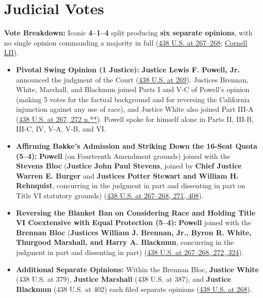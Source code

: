 \documentclass[12pt]{article}
\begin{document}
\section{Judicial Votes}
\textbf{Vote Breakdown:} Iconic \textbf{4--1--4} split producing \textbf{six separate opinions}, with no single opinion commanding a majority in full (\href{https://supreme.justia.com/cases/federal/us/438/265/}{438 U.S. at 267--268}; \href{https://www.law.cornell.edu/supremecourt/text/438/265}{Cornell LII}).
\begin{itemize}
\item \textbf{Pivotal Swing Opinion (1 Justice):} \textbf{Justice Lewis F. Powell, Jr.} announced the judgment of the Court (\href{https://supreme.justia.com/cases/federal/us/438/265/}{438 U.S. at 269}). Justices Brennan, White, Marshall, and Blackmun joined Parts I and V-C of Powell's opinion (making 5 votes for the factual background and for reversing the California injunction against any use of race), and Justice White also joined Part III-A (\href{https://supreme.justia.com/cases/federal/us/438/265/}{438 U.S. at 267, 272 n.**}). Powell spoke for himself alone in Parts II, III-B, III-C, IV, V-A, V-B, and VI.
\item \textbf{Affirming Bakke's Admission and Striking Down the 16-Seat Quota (5--4):} \textbf{Powell} (on Fourteenth Amendment grounds) joined with the \textbf{Stevens Bloc} (\textbf{Justice John Paul Stevens}, joined by \textbf{Chief Justice Warren E. Burger} and \textbf{Justices Potter Stewart and William H. Rehnquist}, concurring in the judgment in part and dissenting in part on Title VI statutory grounds) (\href{https://supreme.justia.com/cases/federal/us/438/265/}{438 U.S. at 267--268, 271, 408}).
\item \textbf{Reversing the Blanket Ban on Considering Race and Holding Title VI Coextensive with Equal Protection (5--4):} \textbf{Powell} joined with the \textbf{Brennan Bloc} (\textbf{Justices William J. Brennan, Jr., Byron R. White, Thurgood Marshall, and Harry A. Blackmun}, concurring in the judgment in part and dissenting in part) (\href{https://supreme.justia.com/cases/federal/us/438/265/}{438 U.S. at 267--268, 272, 324}).
\item \textbf{Additional Separate Opinions:} Within the Brennan Bloc, \textbf{Justice White} (438 U.S. at 379), \textbf{Justice Marshall} (438 U.S. at 387), and \textbf{Justice Blackmun} (438 U.S. at 402) each filed separate opinions (\href{https://supreme.justia.com/cases/federal/us/438/265/}{438 U.S. at 268}).
\end{itemize}
\end{document}
